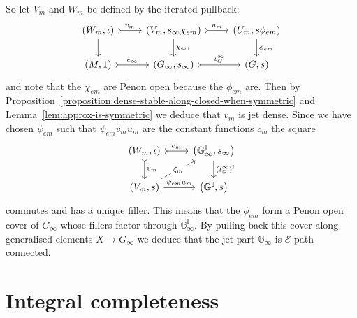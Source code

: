 \documentclass[10pt,a4paper]{amsart}
\numberwithin{equation}{section}
\begin{document}
So let $V_{m}$ and $W_{m}$ be def\/ined by the iterated pullback:
\begin{equation*}\begin{tikzcd}
(W_{m},\iota) \dar \rar[rightarrowtail]{v_m} & (V_{m},s_{\infty}\chi_{em}) \dar{\chi_{em}} \rar[rightarrowtail]{u_m} & (U_{m},s\phi_{em})\dar{\phi_{em}} \\
(M,1) \rar[rightarrowtail]{e_{\infty}} & (G_{\infty},s_{\infty}) \rar[rightarrowtail]{\iota^{\infty}_{G}} & (G,s)
\end{tikzcd}\end{equation*}
and note that the $\chi_{em}$ are Penon open because the $\phi_{em}$ are. Then by Proposition~\ref{proposition:dense-stable-along-closed-when-symmetric} and Lemma~\ref{lem:approx-is-symmetric} we deduce that $v_m$ is jet dense. Since we have chosen $\psi_{em}$ such that $\psi_{em} v_m u_m$ are the constant functions $c_m$ the square
\begin{equation*}\begin{tikzcd}
(W_m,\iota) \rar[rightarrowtail]{c_m} \dar[rightarrowtail]{v_m} & \big(\mathbb{G}_{\infty}^{\mathbb{I}},s_{\infty}\big) \dar{({\iota_{\mathbb{G}}^{\infty}})^{\mathbb{I}}}\\
(V_m,s) \urar[dashed][description]{\zeta_m} \rar{\psi_{em} u_m} & \big(\mathbb{G}^{\mathbb{I}},s\big)
\end{tikzcd}\end{equation*}
commutes and has a unique f\/iller. This means that the $\phi_{em}$ form a Penon open cover of $G_{\infty}$ whose f\/illers factor through $\mathbb{G}_{\infty}^{\mathbb{I}}$. By pulling back this cover along generalised elements $X \rightarrow G_{\infty}$ we deduce that the jet part $\mathbb{G}_{\infty}$ is $\mathcal{E}$-path connected.

\section{Integral completeness}\label{sec:integral-completeness}
\end{document}
